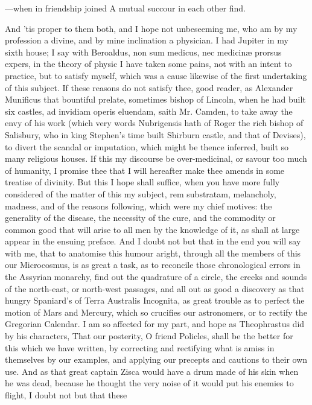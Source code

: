 {---when in friendship joined
A mutual succour in each other find.

And 'tis proper to them both, and I hope not unbeseeming me, who am by
my profession a divine, and by mine inclination a physician. I had
Jupiter in my sixth house; I say with Beroaldus, non sum medicus,
nec medicin\ae{} prorsus expers, in the theory of physic I have taken some
pains, not with an intent to practice, but to satisfy myself, which was
a cause likewise of the first undertaking of this subject.
If these reasons do not satisfy thee, good reader, as Alexander
Munificus that bountiful prelate, sometimes bishop of Lincoln, when he
had built six castles, ad invidiam operis eluendam, saith Mr.
Camden, to take away the envy of his work (which very words Nubrigensis
hath of Roger the rich bishop of Salisbury, who in king Stephen's time
built Shirburn castle, and that of Devises), to divert the scandal or
imputation, which might be thence inferred, built so many religious
houses. If this my discourse be over-medicinal, or savour too much of
humanity, I promise thee that I will hereafter make thee amends in some
treatise of divinity. But this I hope shall suffice, when you have more
fully considered of the matter of this my subject, rem substratam,
melancholy, madness, and of the reasons following, which were my chief
motives: the generality of the disease, the necessity of the cure, and
the commodity or common good that will arise to all men by the
knowledge of it, as shall at large appear in the ensuing preface. And I
doubt not but that in the end you will say with me, that to anatomise
this humour aright, through all the members of this our Microcosmus, is
as great a task, as to reconcile those chronological errors in the
Assyrian monarchy, find out the quadrature of a circle, the creeks and
sounds of the north-east, or north-west passages, and all out as good a
discovery as that hungry Spaniard's of Terra Australis Incognita,
as great trouble as to perfect the motion of Mars and Mercury, which so
crucifies our astronomers, or to rectify the Gregorian Calendar. I am
so affected for my part, and hope as Theophrastus did by his
characters, That our posterity, O friend Policles, shall be the better
for this which we have written, by correcting and rectifying what is
amiss in themselves by our examples, and applying our precepts and
cautions to their own use. And as that great captain Zisca would have a
drum made of his skin when he was dead, because he thought the very
noise of it would put his enemies to flight, I doubt not but that these
}
